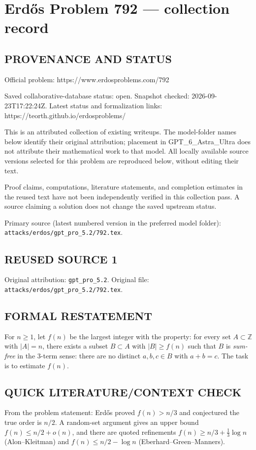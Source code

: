\section*{Erd\H{o}s Problem 792 --- collection record}

\subsection*{PROVENANCE AND STATUS}
Official problem: https://www.erdosproblems.com/792

Saved collaborative-database status: open.
Snapshot checked: 2026-09-23T17:22:24Z.
Latest status and formalization links: https://teorth.github.io/erdosproblems/

This is an attributed collection of existing writeups. The model-folder names below identify their original attribution; placement in GPT\_6\_Astra\_Ultra does not attribute their mathematical work to that model. All locally available source versions selected for this problem are reproduced below, without editing their text.

Proof claims, computations, literature statements, and completion estimates in the reused text have not been independently verified in this collection pass. A source claiming a solution does not change the saved upstream status.

Primary source (latest numbered version in the preferred model folder): \texttt{attacks/erdos/gpt\_pro\_5.2/792.tex}.

\subsection*{REUSED SOURCE 1}
Original attribution: \texttt{gpt\_pro\_5.2}.
Original file: \texttt{attacks/erdos/gpt\_pro\_5.2/792.tex}.


\subsection*{FORMAL RESTATEMENT}
For $n\ge 1$, let $f(n)$ be the largest integer with the property:
for every set $A\subset\mathbb Z$ with $|A|=n$, there exists a subset $B\subset A$ with $|B|\ge f(n)$ such that $B$ is \emph{sum-free} in the 3-term sense:
there are no distinct $a,b,c\in B$ with $a+b=c$.
The task is to estimate $f(n)$.

\subsection*{QUICK LITERATURE/CONTEXT CHECK}
From the problem statement: Erd\H{o}s proved $f(n)>n/3$ and conjectured the true order is $n/2$. A random-set argument gives an upper bound $f(n)\le n/2+o(n)$, and there are quoted refinements
$f(n)\ge n/3 + \tfrac13\log n$ (Alon--Kleitman) and $f(n)\le n/2-\log n$ (Eberhard--Green--Manners).

